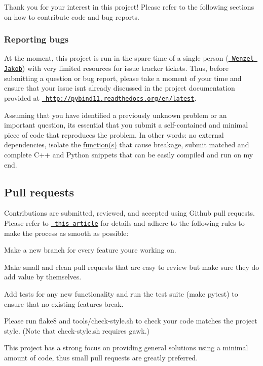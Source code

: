 Thank you for your interest in this project! Please refer to the following sections on how to contribute code and bug reports.

\subsubsection*{Reporting bugs}

At the moment, this project is run in the spare time of a single person (\href{http://rgl.epfl.ch/people/wjakob}{\texttt{ Wenzel Jakob}}) with very limited resources for issue tracker tickets. Thus, before submitting a question or bug report, please take a moment of your time and ensure that your issue isn\textquotesingle{}t already discussed in the project documentation provided at \href{http://pybind11.readthedocs.org/en/latest}{\texttt{ http\+://pybind11.\+readthedocs.\+org/en/latest}}.

Assuming that you have identified a previously unknown problem or an important question, it\textquotesingle{}s essential that you submit a self-\/contained and minimal piece of code that reproduces the problem. In other words\+: no external dependencies, isolate the \mbox{\hyperlink{classfunction}{function(s)}} that cause breakage, submit matched and complete C++ and Python snippets that can be easily compiled and run on my end.

\subsection*{Pull requests}

Contributions are submitted, reviewed, and accepted using Github pull requests. Please refer to \href{https://help.github.com/articles/using-pull-requests}{\texttt{ this article}} for details and adhere to the following rules to make the process as smooth as possible\+:


\begin{DoxyItemize}
\item Make a new branch for every feature you\textquotesingle{}re working on.
\item Make small and clean pull requests that are easy to review but make sure they do add value by themselves.
\item Add tests for any new functionality and run the test suite ({\ttfamily make pytest}) to ensure that no existing features break.
\item Please run {\ttfamily flake8} and {\ttfamily tools/check-\/style.\+sh} to check your code matches the project style. (Note that {\ttfamily check-\/style.\+sh} requires {\ttfamily gawk}.)
\item This project has a strong focus on providing general solutions using a minimal amount of code, thus small pull requests are greatly preferred.
\end{DoxyItemize}

